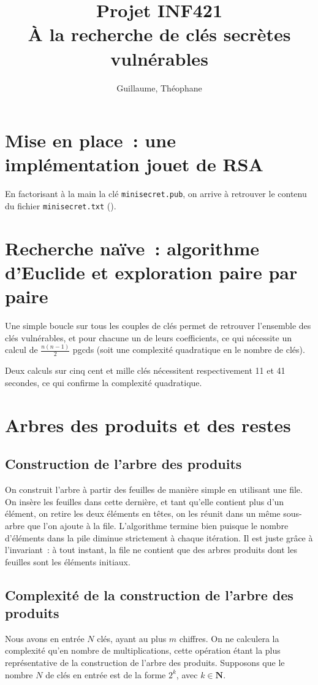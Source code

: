 \documentclass[a4paper,10pt]{article}
\title{Projet INF421 \\ À la recherche de clés secrètes vulnérables}
\author{\bsc{Hétier} Guillaume, \bsc{Hufschmitt} Théophane}
\begin{document}
\maketitle

\begin{abstract}

\end{abstract}

\section{Mise en place~: une implémentation jouet de RSA}
En factorisant à la main la clé \texttt{minisecret.pub}, on arrive à retrouver le contenu du fichier \texttt{minisecret.txt} ().
\section{Recherche naïve~: algorithme d'Euclide et exploration paire par paire}
Une simple boucle sur tous les couples de clés permet de retrouver l'ensemble des clés vulnérables, et pour chacune un de leurs coefficients, ce qui nécessite un calcul de $\frac{n(n-1)}{2}$ pgcds (soit une complexité quadratique en le nombre de clés).

  Deux calculs sur cinq cent et mille clés nécessitent respectivement 11 et 41 secondes, ce qui confirme la complexité quadratique.
\section{Arbres des produits et des restes}

  \subsection{Construction de l'arbre des produits}
  On construit l'arbre à partir des feuilles de manière simple en utilisant une file. On insère les feuilles dans cette dernière, et tant qu'elle contient plus d'un élément, on retire les deux éléments en têtes, on les réunit dans un même sous-arbre que l'on ajoute à la file.
  L'algorithme termine bien puisque le nombre d'éléments dans la pile diminue strictement à chaque itération. Il est juste grâce à l'invariant~: à tout instant, la file ne contient que des arbres produits dont les feuilles sont les éléments initiaux.
  
  \subsection{Complexité de la construction de l'arbre des produits}
  Nous avons en entrée $N$ clés, ayant au plus $m$ chiffres.
  On ne calculera la complexité qu'en nombre de multiplications, cette opération étant la plus représentative de la construction de l'arbre des produits.
  Supposons que le nombre $N$ de clés en entrée est de la forme $2^k$, avec $k\in\mathbf{N}$.
  
\end{document}
